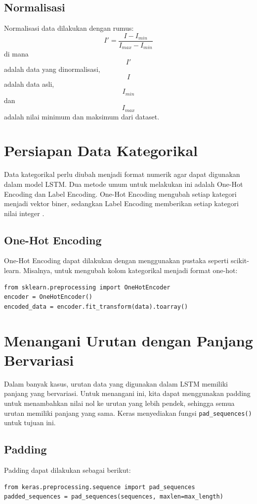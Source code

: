 \subsection{Normalisasi}
\par Normalisasi data dilakukan dengan rumus:
$$
I' = \frac{I - I_{min}}{I_{max} - I_{min}}
$$
di mana $$I'$$ adalah data yang dinormalisasi, $$I$$ adalah data asli, $$I_{min}$$ dan $$I_{max}$$ adalah nilai minimum dan maksimum dari dataset.

\section{Persiapan Data Kategorikal}
\par Data kategorikal perlu diubah menjadi format numerik agar dapat digunakan dalam model LSTM. Dua metode umum untuk melakukan ini adalah One-Hot Encoding dan Label Encoding. One-Hot Encoding mengubah setiap kategori menjadi vektor biner, sedangkan Label Encoding memberikan setiap kategori nilai integer \citep{brownlee2017}.

\subsection{One-Hot Encoding}
\par One-Hot Encoding dapat dilakukan dengan menggunakan pustaka seperti scikit-learn. Misalnya, untuk mengubah kolom kategorikal menjadi format one-hot:
\begin{verbatim}
from sklearn.preprocessing import OneHotEncoder
encoder = OneHotEncoder()
encoded_data = encoder.fit_transform(data).toarray()
\end{verbatim}

\section{Menangani Urutan dengan Panjang Bervariasi}
\par Dalam banyak kasus, urutan data yang digunakan dalam LSTM memiliki panjang yang bervariasi. Untuk menangani ini, kita dapat menggunakan padding untuk menambahkan nilai nol ke urutan yang lebih pendek, sehingga semua urutan memiliki panjang yang sama. Keras menyediakan fungsi \texttt{pad\_sequences()} untuk tujuan ini.

\subsection{Padding}
\par Padding dapat dilakukan sebagai berikut:
\begin{verbatim}
from keras.preprocessing.sequence import pad_sequences
padded_sequences = pad_sequences(sequences, maxlen=max_length)
\end{verbatim}

